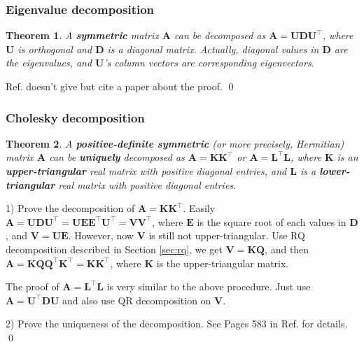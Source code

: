 \documentclass[12pt]{article}
\newtheorem{theorem}{Theorem}[section]
\numberwithin{equation}{section}
\renewenvironment{proof}{{\bfseries Proof.}}{\qed \\}
\begin{document}
\subsubsection{Eigenvalue decomposition}
\label{sec:eigen_decomp}

\begin{theorem}
A \textbf{symmetric} matrix $\mathbf{A}$ can be decomposed as $\mathbf{A} = \mathbf{U}\mathbf{D}\mathbf{U}^\top$, where $\mathbf{U}$ is orthogonal and $\mathbf{D}$ is a diagonal matrix. Actually,  diagonal values in $\mathbf{D}$ are the eigenvalues, and $\mathbf{U}$'s column vectors are corresponding eigenvectors.
\label{theorem:eigen_decomp}
\end{theorem}

\begin{proof}
Ref. \citep{hartley2003multiple} doesn't give but cite a paper about the proof.
\end{proof}

\subsubsection{Cholesky decomposition}
\label{sec:cholesky}

\begin{theorem}
A \textbf{positive-definite symmetric} (or more precisely, Hermitian) matrix $\mathbf{A}$ can be \textbf{uniquely} decomposed as $\mathbf{A} = \mathbf{KK}^\top$ or $\mathbf{A} = \mathbf{L}^\top\mathbf{L}$, where $\mathbf{K}$ is an \textbf{upper-triangular} real matrix with positive diagonal entries, and $\mathbf{L}$ is a \textbf{lower-triangular} real matrix with positive diagonal entries.
\end{theorem}

\begin{proof}

1) Prove the decomposition of $\mathbf{A} = \mathbf{KK}^\top$. Easily $\mathbf{A} =  \mathbf{U}\mathbf{D}\mathbf{U}^\top =  \mathbf{U}\mathbf{E}\mathbf{E}^\top\mathbf{U}^\top = \mathbf{V}\mathbf{V}^\top$, where $\mathbf{E}$ is the square root of each values in $\mathbf{D}$, and $\mathbf{V} = \mathbf{UE}$. However, now $\mathbf{V}$ is still not upper-triangular. Use RQ decomposition described in Section \ref{sec:rq}, we get $\mathbf{V} = \mathbf{KQ}$, and then $\mathbf{A} = \mathbf{KQ}\mathbf{Q}^\top\mathbf{K}^\top = \mathbf{K}\mathbf{K}^\top$, where $\mathbf{K}$ is the upper-triangular matrix.

The proof of $\mathbf{A} = \mathbf{L}^\top\mathbf{L}$ is very similar to the above procedure. Just use $\mathbf{A} =  \mathbf{U}^\top\mathbf{D}\mathbf{U}$ and also use QR decomposition on $\mathbf{V}$.

2) Prove the uniqueness of the decomposition. See Pages 583 in Ref. \cite{hartley2003multiple} for details.
\end{proof}
\end{document}
